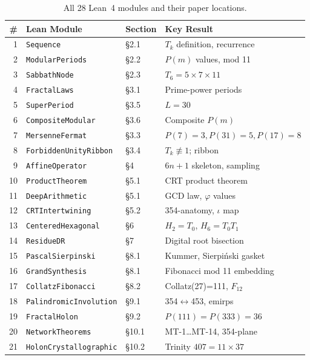\documentclass[11pt, a4paper]{article}
\theoremstyle{plain}
\theoremstyle{definition}
\theoremstyle{remark}
\begin{document}
\begin{table}[H]
\centering
\small
\caption{All 28 Lean~4 modules and their paper locations.}\label{tab:lean}
\smallskip
\begin{tabular}{@{}rlll@{}}
\toprule
\# & Lean Module & Section & Key Result \\
\midrule
1  & \texttt{Sequence}             & \S2.1  & $T_k$ definition, recurrence \\
2  & \texttt{ModularPeriods}       & \S2.2  & $P(m)$ values, mod 11 \\
3  & \texttt{SabbathNode}          & \S2.3  & $T_6 = 5 \times 7 \times 11$ \\
4  & \texttt{FractalLaws}          & \S3.1  & Prime-power periods \\
5  & \texttt{SuperPeriod}          & \S3.5  & $L = 30$ \\
6  & \texttt{CompositeModular}     & \S3.6  & Composite $P(m)$ \\
7  & \texttt{MersenneFermat}       & \S3.3  & $P(7)=3, P(31)=5, P(17)=8$ \\
8  & \texttt{ForbiddenUnityRibbon} & \S3.4  & $T_k \not\equiv 1$; ribbon \\
9  & \texttt{AffineOperator}       & \S4    & $6n+1$ skeleton, sampling \\
10 & \texttt{ProductTheorem}       & \S5.1  & CRT product theorem \\
11 & \texttt{DeepArithmetic}       & \S5.1  & GCD law, $\varphi$ values \\
12 & \texttt{CRTIntertwining}      & \S5.2  & 354-anatomy, $\iota$ map \\
13 & \texttt{CenteredHexagonal}    & \S6    & $H_2 = T_0$, $H_6 = T_0 T_1$ \\
14 & \texttt{ResidueDR}            & \S7    & Digital root bisection \\
15 & \texttt{PascalSierpinski}     & \S8.1  & Kummer, Sierpi\'nski gasket \\
16 & \texttt{GrandSynthesis}       & \S8.1  & Fibonacci mod 11 embedding \\
17 & \texttt{CollatzFibonacci}     & \S8.2  & Collatz(27)=111, $F_{12}$ \\
18 & \texttt{PalindromicInvolution} & \S9.1 & 354$\leftrightarrow$453, emirps \\
19 & \texttt{FractalHolon}         & \S9.2  & $P(111)=P(333)=36$ \\
20 & \texttt{NetworkTheorems}      & \S10.1 & MT-1\ldots MT-14, 354-plane \\
21 & \texttt{HolonCrystallographic} & \S10.2 & Trinity $407=11\times37$ \\

\end{tabular}
\end{table}
\end{document}
